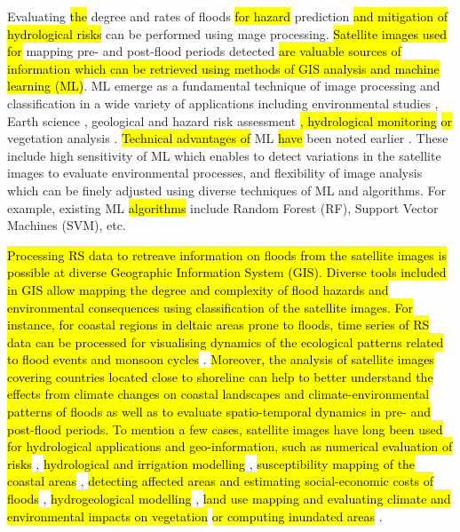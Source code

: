 \documentclass[water,article,submit,pdftex,moreauthors]{Definitions/mdpi}
\begin{document}
Evaluating \hl{the }degree and rates of floods \hl{for hazard} prediction \hl{and mitigation of hydrological risks }can be performed using\hl{ }mage processing. \hl{Satellite images used for} mapping\hl{ }pre- and post-flood periods detected \hl{are valuable sources of information which can be retrieved using methods of GIS analysis and machine learning (ML)}. ML emerge as a fundamental technique of image processing and classification\hl{ }in a wide variety of applications including\hl{ }environmental studies \cite{ROCHA2022107415}, Earth science \cite{LI2023103345,Lemenkova202306,XIONG2021145256}, geological and hazard risk assessment \cite{AOURAGH2023100939}\hl{, hydrological monitoring} \cite{RAFIK2023101569} \hl{or} vegetation analysis \cite{WU2023110723,Lemenkova202310,DOSSANTOS2022106753}. \hl{Technical advantages of} ML \hl{have} been noted earlier \cite{9883389,coasts4010008}. These include\hl{ }high sensitivity of ML which enables to detect variations in the satellite images to evaluate environmental processes, and flexibility of image analysis which can be finely adjusted using diverse techniques of ML and algorithms. For example, existing ML \hl{algorithms} include Random Forest (RF), Support Vector Machines (SVM), etc.

\hl{Processing RS data to retreave information on floods from the satellite images is possible at diverse Geographic Information System (GIS). Diverse tools included in GIS allow mapping the degree and complexity of flood hazards and environmental consequences using classification of the satellite images. For instance, for coastal regions in deltaic areas prone to floods, time series of RS data can be processed for visualising dynamics of the ecological patterns related to flood events and monsoon cycles} \citep{RAZAVITERMEH2023100595,SINGHA2023316,MATHEW2021100861}. \hl{Moreover, the analysis of satellite images covering countries located close to shoreline can help to better understand the effects from climate changes on coastal landscapes and climate-environmental patterns of floods as well as to evaluate spatio-temporal dynamics in pre- and post-flood periods. To mention a few cases, satellite images have long been used for hydrological applications and geo-information, such as numerical evaluation of risks} \citep{THAKUR2024130683}, \hl{hydrological and irrigation modelling} \cite{SUN2024415}, \hl{susceptibility mapping of the coastal areas} \cite{RAZAVITERMEH2023100595}, \hl{detecting affected areas and estimating social-economic costs of floods} \cite{ZHENG2023101410,DUAN2024131010}, \hl{hydrogeological modelling} \cite{BELL2021107451}, \hl{land use mapping and evaluating climate and environmental impacts on vegetation} \cite{JARAMILLO2024526} \hl{or computing inundated areas} \cite{ZUO2024}.
\end{document}
